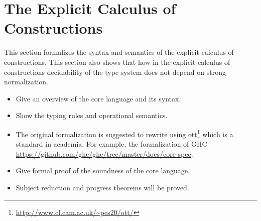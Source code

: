 \section{The Explicit Calculus of Constructions}


This section formalizes the syntax and semantics of the explicit calculus 
of constructions. This section also shows that how in the explicit 
calculus of constructions decidability of the type system does not 
depend on strong normalization.

\begin{itemize}
\item Give an overview of the core language and its syntax.
\item Show the typing rules and operational semantics.
\item The original formalization is suggested to rewrite using \textsf{ott}\footnote{\url{http://www.cl.cam.ac.uk/~pes20/ott/}} which is a standard in academia. For example, the formalization of GHC \url{https://github.com/ghc/ghc/tree/master/docs/core-spec}.
\item Give formal proof of the soundness of the core language.
\item Subject reduction and progress theorems will be proved.
\end{itemize}